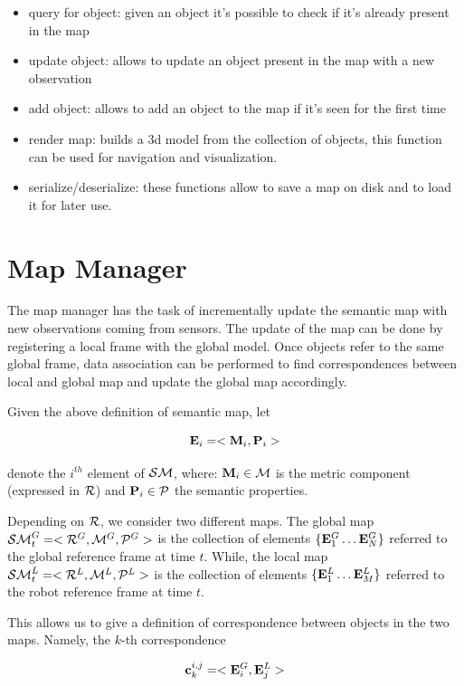 \documentclass{article}
\begin{document}
	\begin{itemize}
		\item query for object: given an object it's possible to check if it's already present in the map
		\item update object: allows to update an object present in the map with a new observation
		\item add object: allows to add an object to the map if it's seen for the first time
		\item render map: builds a 3d model from the collection of objects, this function can be used for navigation and visualization.
		\item serialize/deserialize: these functions allow to save a map on disk and to load it for later use.
	\end{itemize}
	
	\section{Map Manager}
	
	The map manager has the task of incrementally update the semantic map with new observations coming from sensors. The update of the map can be done by registering a local frame with the global model. Once objects refer to the same global frame, data association can be performed to find correspondences between local and global map and update the global map accordingly.
	
	Given the above definition of semantic map, let 
	
	\begin{equation}
		\mathbf{E}_i = < \mathbf{M}_i,\mathbf{P}_i >
	\end{equation}
	
	\noindent
	denote the $i^{th}$ element of $\mathcal{SM}$, where: $\mathbf{M}_i \in \mathcal{M}$ is the metric component (expressed in $\mathcal{R}$) and $\mathbf{P}_i \in \mathcal{P}$ the semantic properties. 
	
	Depending on $\mathcal{R}$, we consider two different maps. The global map $\mathcal{SM}^G_t = < \mathcal{R}^G, \mathcal{M}^G, \mathcal{P}^G >$  is the collection of elements $\{ \mathbf{E}_1^G \dots \mathbf{E}_N^G \}$ referred to the global reference frame at time $t$. While, the local map $\mathcal{SM}^L_t = < \mathcal{R}^L, \mathcal{M}^L, \mathcal{P}^L >$ is the collection of elements $\{ \mathbf{E}_1^L \dots \mathbf{E}_M^L \}$ referred to the robot reference frame at time $t$. 
	
	This allows us to give a definition of correspondence between objects in the two maps. Namely, the $k$-th correspondence
	 
	\begin{equation}
		\mathbf{c}^{i,j}_k = <\mathbf{E}_i^G,\mathbf{E}_j^L> 
	\end{equation}
	
\end{document}
